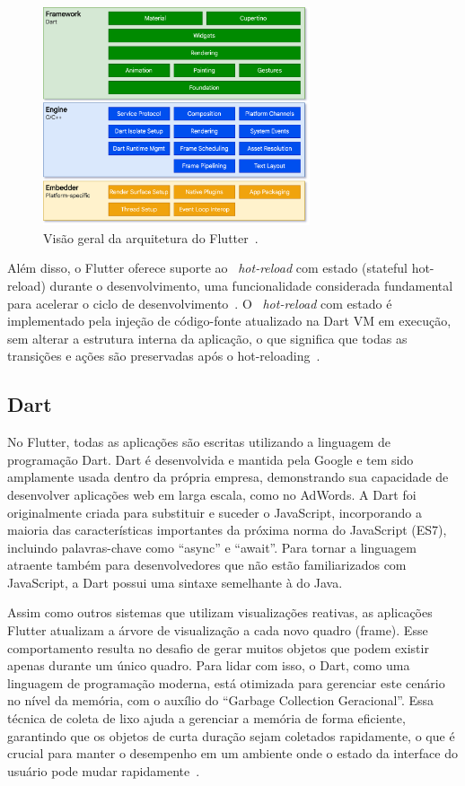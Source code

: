 \begin{figure}[H]
    \centering
    \includegraphics[width=0.7\textwidth]{imagens/flutter_architecture}
    \caption{Visão geral da arquitetura do Flutter~\cite{flutter}.}
    \label{fig:architecture}
\end{figure}

Além disso, o Flutter oferece suporte ao ~\textit{hot-reload} com estado (stateful hot-reload) durante o desenvolvimento, uma funcionalidade considerada fundamental para acelerar o ciclo de desenvolvimento~\cite{wu2018react}.
O ~\textit{hot-reload} com estado é implementado pela injeção de código-fonte atualizado na Dart VM em execução, sem alterar a estrutura interna da aplicação, o que significa que todas as transições e ações são preservadas após o hot-reloading~\cite{flutter}.

\subsection{Dart}\label{subsec: dart}
No Flutter, todas as aplicações são escritas utilizando a linguagem de programação Dart.
Dart é desenvolvida e mantida pela Google e tem sido amplamente usada dentro da própria empresa, demonstrando sua capacidade de desenvolver aplicações web em larga escala, como no AdWords.
A Dart foi originalmente criada para substituir e suceder o JavaScript, incorporando a maioria das características importantes da próxima norma do JavaScript (ES7), incluindo palavras-chave como “async” e “await”.
Para tornar a linguagem atraente também para desenvolvedores que não estão familiarizados com JavaScript, a Dart possui uma sintaxe semelhante à do Java.

Assim como outros sistemas que utilizam visualizações reativas, as aplicações Flutter atualizam a árvore de visualização a cada novo quadro (frame).
Esse comportamento resulta no desafio de gerar muitos objetos que podem existir apenas durante um único quadro.
Para lidar com isso, o Dart, como uma linguagem de programação moderna, está otimizada para gerenciar este cenário no nível da memória, com o auxílio do “Garbage Collection Geracional”.
Essa técnica de coleta de lixo ajuda a gerenciar a memória de forma eficiente, garantindo que os objetos de curta duração sejam coletados rapidamente, o que é crucial para manter o desempenho em um ambiente onde o estado da interface do usuário pode mudar rapidamente~\cite{flutter}.

